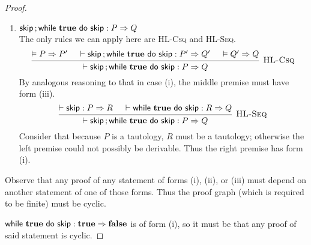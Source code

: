 \begin{proof}
\begin{enumerate}[label=(\roman*)]
\item $\Triple {\Seq \Skip ; {\While {\True} do {\Skip}} } : P => Q$ \\
    The only rules we can apply here are \textsc{HL-Csq} and \textsc{HL-Seq}.
%
    \[\begin{prooftree}
        \hypo{\VAL P \Rightarrow P'}
        \hypo{\DER \Triple {\Seq \Skip ; {\While {\True} do {\Skip}} } : P' => Q'}
        \hypo{\VAL Q' \Rightarrow Q}
        \infer3[\textsc{HL-Csq}] 
            {\DER \Triple {\Seq \Skip ; {\While {\True} do {\Skip}} } : P => Q}
    \end{prooftree}\]
%
    By analogous reasoning to that in case (i),
    the middle premise must have form (iii).
    \[\begin{prooftree}
        \hypo{\DER \Triple \Skip : P => R}
        \hypo{\DER \Triple {\While {\True} do {\Skip} } : R => Q}
        \infer2[\textsc{HL-Seq}] 
            {\DER \Triple {\Seq \Skip ; {\While {\True} do {\Skip}} } : P => Q}
    \end{prooftree}\]
%
    Consider that because $P$ is a tautology, $R$ must be a tautology; 
    otherwise the left premise could not possibly be derivable.
    Thus the right premise has form (i).
    
\end{enumerate}

Observe that any proof of any statement of forms (i), (ii), or (iii)
must depend on another statement of one of those forms.
Thus the proof graph (which is required to be finite) must be cyclic.

$\Triple {\While {\True} do {\Skip} } : \True => \False$ is of form (i),
so it must be that any proof of said statement is cyclic.

\end{proof}
